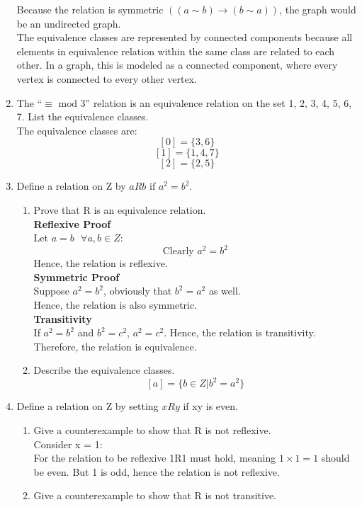 \documentclass[12pt]{article}
\begin{document}
\begin{enumerate}
  Because the relation is symmetric $((a \sim b) \rightarrow (b \sim a))$, the graph would be an undirected graph. \\
  The equivalence classes are represented by connected components because all elements in equivalence relation within the same class are related to each other. In a graph, this is modeled as a connected component, where every vertex is connected to every other vertex. 
  \item The “$\equiv \text{ mod } 3$” relation is an equivalence relation on the set {1, 2, 3, 4, 5, 6, 7}. List the equivalence classes.\\
  The equivalence classes are:
  \[[0] = \{3,6\}\]
  \[[1] = \{1,4,7\}\]
  \[[2] = \{2,5\}\]
  \item Define a relation on Z by $aRb$ if $a^2 = b^2$.
  \begin{enumerate}
    \item Prove that R is an equivalence relation.\\
    \textbf{Reflexive Proof}\\
    Let $a = b \text{ } \forall a,b \in Z$:
    \[\text{Clearly }a^2 = b^2\]
    Hence, the relation is reflexive.\\
    \textbf{Symmetric Proof}\\
    Suppose $a^2 = b^2$, obviously that $b^2 = a^2$ as well.\\
    Hence, the relation is also symmetric.\\
    \textbf{Transitivity}\\
    If $a^2 = b^2$ and $b^2 = c^2$, $a^2 = c^2$. Hence, the relation is transitivity.\\
    Therefore, the relation is equivalence.
    \item Describe the equivalence classes.
        \[[a] = \{b \in Z| b^2 = a^2\}\]
  \end{enumerate}
  \item Define a relation on Z by setting $x R y$ if xy is even.
  \begin{enumerate}
    \item Give a counterexample to show that R is not reflexive.\\
    Consider x = 1:\\
    For the relation to be reflexive 1R1 must hold, meaning $1 \times 1 = 1$ should be even. But 1 is odd, hence the relation is not reflexive.
    \item Give a counterexample to show that R is not transitive.\\

\end{enumerate}
\end{enumerate}
\end{document}
